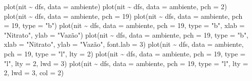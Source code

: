 \documentclass[
]{book}
\newenvironment{Shaded}{\begin{snugshade}}{\end{snugshade}}
\newcommand{\AttributeTok}[1]{\textcolor[rgb]{0.77,0.63,0.00}{#1}}
\newcommand{\DecValTok}[1]{\textcolor[rgb]{0.00,0.00,0.81}{#1}}
\newcommand{\FunctionTok}[1]{\textcolor[rgb]{0.00,0.00,0.00}{#1}}
\newcommand{\NormalTok}[1]{#1}
\newcommand{\SpecialCharTok}[1]{\textcolor[rgb]{0.00,0.00,0.00}{#1}}
\newcommand{\StringTok}[1]{\textcolor[rgb]{0.31,0.60,0.02}{#1}}
\begin{document}
\begin{Shaded}
\begin{Highlighting}[]
\FunctionTok{plot}\NormalTok{(nit }\SpecialCharTok{\textasciitilde{}}\NormalTok{ dfs, }\AttributeTok{data =}\NormalTok{ ambiente)}
\FunctionTok{plot}\NormalTok{(nit }\SpecialCharTok{\textasciitilde{}}\NormalTok{ dfs, }\AttributeTok{data =}\NormalTok{ ambiente, }\AttributeTok{pch =} \DecValTok{2}\NormalTok{)}
\FunctionTok{plot}\NormalTok{(nit }\SpecialCharTok{\textasciitilde{}}\NormalTok{ dfs, }\AttributeTok{data =}\NormalTok{ ambiente, }\AttributeTok{pch =} \DecValTok{19}\NormalTok{)}
\FunctionTok{plot}\NormalTok{(nit }\SpecialCharTok{\textasciitilde{}}\NormalTok{ dfs, }\AttributeTok{data =}\NormalTok{ ambiente, }\AttributeTok{pch =} \DecValTok{19}\NormalTok{, }\AttributeTok{type =} \StringTok{"b"}\NormalTok{)}
\FunctionTok{plot}\NormalTok{(nit }\SpecialCharTok{\textasciitilde{}}\NormalTok{ dfs, }\AttributeTok{data =}\NormalTok{ ambiente, }\AttributeTok{pch =} \DecValTok{19}\NormalTok{, }\AttributeTok{type =} \StringTok{"b"}\NormalTok{,}
     \AttributeTok{xlab =} \StringTok{"Nitrato"}\NormalTok{, }\AttributeTok{ylab =} \StringTok{"Vazão"}\NormalTok{)}
\FunctionTok{plot}\NormalTok{(nit }\SpecialCharTok{\textasciitilde{}}\NormalTok{ dfs, }\AttributeTok{data =}\NormalTok{ ambiente, }\AttributeTok{pch =} \DecValTok{19}\NormalTok{, }\AttributeTok{type =} \StringTok{"b"}\NormalTok{, }
     \AttributeTok{xlab =} \StringTok{"Nitrato"}\NormalTok{, }\AttributeTok{ylab =} \StringTok{"Vazão"}\NormalTok{, }\AttributeTok{font.lab =} \DecValTok{3}\NormalTok{)}
\FunctionTok{plot}\NormalTok{(nit }\SpecialCharTok{\textasciitilde{}}\NormalTok{ dfs, }\AttributeTok{data =}\NormalTok{ ambiente, }\AttributeTok{pch =} \DecValTok{19}\NormalTok{, }\AttributeTok{type =} \StringTok{"l"}\NormalTok{, }
     \AttributeTok{lty =} \DecValTok{2}\NormalTok{)}
\FunctionTok{plot}\NormalTok{(nit }\SpecialCharTok{\textasciitilde{}}\NormalTok{ dfs, }\AttributeTok{data =}\NormalTok{ ambiente, }\AttributeTok{pch =} \DecValTok{19}\NormalTok{, }\AttributeTok{type =} \StringTok{"l"}\NormalTok{, }
     \AttributeTok{lty =} \DecValTok{2}\NormalTok{, }\AttributeTok{lwd =} \DecValTok{3}\NormalTok{)}
\FunctionTok{plot}\NormalTok{(nit }\SpecialCharTok{\textasciitilde{}}\NormalTok{ dfs, }\AttributeTok{data =}\NormalTok{ ambiente, }\AttributeTok{pch =} \DecValTok{19}\NormalTok{, }\AttributeTok{type =} \StringTok{"l"}\NormalTok{, }
     \AttributeTok{lty =} \DecValTok{2}\NormalTok{, }\AttributeTok{lwd =} \DecValTok{3}\NormalTok{, }\AttributeTok{col =} \DecValTok{2}\NormalTok{)}
\end{Highlighting}
\end{Shaded}
\end{document}

